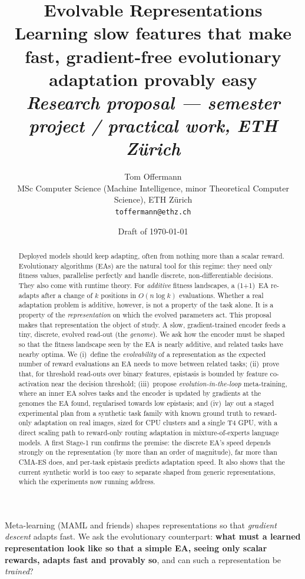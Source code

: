\documentclass[11pt,a4paper]{article}
\title{\textbf{Evolvable Representations}\\[4pt]
\large Learning slow features that make fast, gradient-free evolutionary adaptation provably easy\\[2pt]
\normalsize\itshape Research proposal --- semester project / practical work, ETH Zürich}
\author{Tom Offermann\\ \small MSc Computer Science (Machine Intelligence, minor Theoretical Computer Science), ETH Zürich\\ \small\texttt{toffermann@ethz.ch}}
\date{Draft of \today}
\theoremstyle{definition}
\theoremstyle{plain}
\theoremstyle{remark}
\begin{document}
\maketitle

\begin{abstract}
\noindent
Deployed models should keep adapting, often from nothing more than a scalar reward. Evolutionary algorithms (EAs) are the natural tool for this regime: they need only fitness values, parallelise perfectly and handle discrete, non-differentiable decisions. They also come with runtime theory. For \emph{additive} fitness landscapes, a (1+1)~EA re-adapts after a change of $k$ positions in $O(n\log k)$ evaluations.
Whether a real adaptation problem is additive, however, is not a property of the task alone. It is a property of the \emph{representation} on which the evolved parameters act.
This proposal makes that representation the object of study. A slow, gradient-trained encoder feeds a tiny, discrete, evolved read-out (the \emph{genome}). We ask how the encoder must be shaped so that the fitness landscape seen by the EA is nearly additive, and related tasks have nearby optima.
We (i)~define the \emph{evolvability} of a representation as the expected number of reward evaluations an EA needs to move between related tasks; (ii)~prove that, for threshold read-outs over binary features, epistasis is bounded by feature co-activation near the decision threshold; (iii)~propose \emph{evolution-in-the-loop} meta-training, where an inner EA solves tasks and the encoder is updated by gradients at the genomes the EA found, regularised towards low epistasis; and (iv)~lay out a staged experimental plan from a synthetic task family with known ground truth to reward-only adaptation on real images, sized for CPU clusters and a single T4 GPU, with a direct scaling path to reward-only routing adaptation in mixture-of-experts language models. A first Stage-1 run confirms the premise: the discrete EA's speed depends strongly on the representation (by more than an order of magnitude), far more than CMA-ES does, and per-task epistasis predicts adaptation speed. It also shows that the current synthetic world is too easy to separate shaped from generic representations, which the experiments now running address.
\end{abstract}

\begin{keybox}[title={The question in one sentence}]
Meta-learning (MAML and friends) shapes representations so that \emph{gradient descent} adapts fast.
We ask the evolutionary counterpart: \textbf{what must a learned representation look like so that a simple EA, seeing only scalar rewards, adapts fast and provably so}, and can such a representation be \emph{trained}?
\end{keybox}
\end{document}
